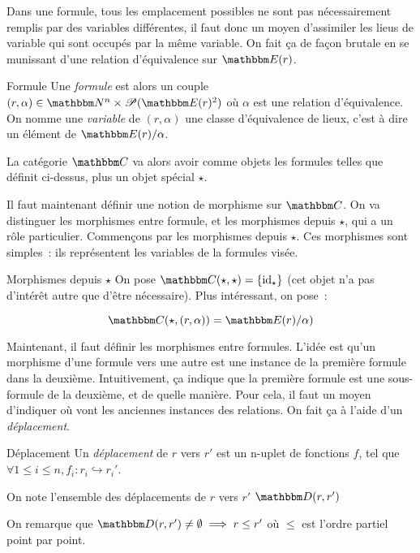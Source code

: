 Dans une formule, tous les emplacement possibles ne sont pas nécessairement remplis
par des variables différentes, il faut donc un moyen d'assimiler les lieus de variable
qui sont occupés par la même variable. On fait ça de façon brutale en se munissant d'une
relation d'équivalence sur $\E(r)$.

\begin{defi}{Formule}
    Une \emph{formule} est alors un couple $(r,\alpha)\in\N^n\times\P(\E(r)^2)$
    où $\alpha$ est une relation d'équivalence. On nomme une \emph{variable} de
    $(r,\alpha)$ une classe d'équivalence de lieux, c'est à dire un élément de
    $\E(r)/\alpha$.
\end{defi}

La catégorie $\C$ va alors avoir comme objets les formules telles que définit ci-dessus,
plus un objet spécial $\star$.

Il faut maintenant définir une notion de morphisme sur $\C$. On va distinguer les
morphismes entre formule, et les morphismes depuis $\star$, qui a un rôle particulier.
Commençons par les morphismes depuis $\star$. Ces morphismes sont simples~: ils 
représentent les variables de la formules visée.

\begin{defi}{Morphismes depuis $\star$}
    On pose $\C(\star,\star) = \{\text{id}_\star\}$ (cet objet n'a pas d'intérêt autre
    que d'être nécessaire). Plus intéressant, on pose~:

    \[\C(\star, (r,\alpha)) = \E(r)/\alpha) \]
\end{defi}

Maintenant, il faut définir les morphismes entre formules. L'idée est qu'un morphisme
d'une formule vers une autre est une instance de la première formule dans la deuxième.
Intuitivement, ça indique que la première formule est une sous-formule de la deuxième,
et de quelle manière. Pour cela, il faut un moyen d'indiquer où vont les anciennes
instances des relations. On fait ça à l'aide d'un \emph{déplacement}.

\begin{defi}{Déplacement}
    Un \emph{déplacement} de $r$ vers $r'$ est un n-uplet de fonctions $f$, tel que
    $\forall 1\leq i\leq n, f_i : r_i\hookrightarrow r_i'$.

    On note l'ensemble des déplacements de $r$ vers $r'$ $\D(r,r')$
\end{defi}

\begin{rem}
    On remarque que $\D(r,r')\neq\emptyset\implies r\leq r'$ où $\leq$ est l'ordre
    partiel point par point.
\end{rem}

